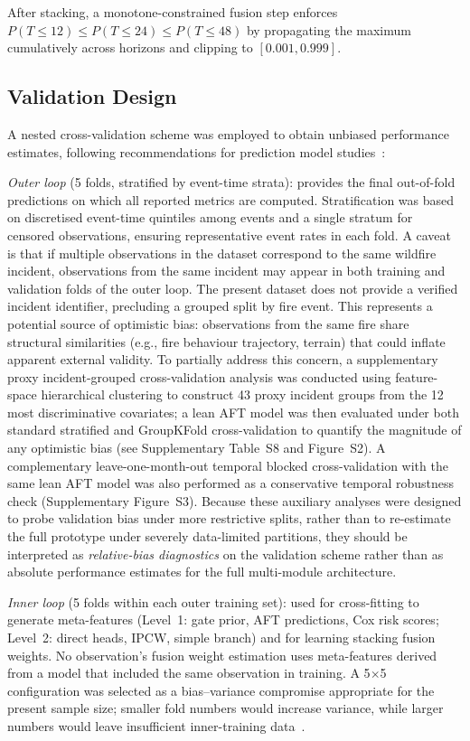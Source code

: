 \documentclass[fire,article,submit,pdftex]{../Definitions/mdpi}
\begin{document}
After stacking, a monotone-constrained fusion step enforces $P(T \leq 12) \leq P(T \leq 24) \leq P(T \leq 48)$ by propagating the maximum cumulatively across horizons and clipping to $[0.001, 0.999]$.

\subsection{Validation Design}\label{sec:validation}

A nested cross-validation scheme was employed to obtain unbiased performance estimates, following recommendations for prediction model studies~\cite{Wolff2019,Steyerberg2019}:

\emph{Outer loop} (5 folds, stratified by event-time strata): provides the final out-of-fold predictions on which all reported metrics are computed.
Stratification was based on discretised event-time quintiles among events and a single stratum for censored observations, ensuring representative event rates in each fold.
A caveat is that if multiple observations in the dataset correspond to the same wildfire incident, observations from the same incident may appear in both training and validation folds of the outer loop.
The present dataset does not provide a verified incident identifier, precluding a grouped split by fire event.
This represents a potential source of optimistic bias: observations from the same fire share structural similarities (e.g., fire behaviour trajectory, terrain) that could inflate apparent external validity.
To partially address this concern, a supplementary proxy incident-grouped cross-validation analysis was conducted using feature-space hierarchical clustering to construct 43 proxy incident groups from the 12 most discriminative covariates; a lean AFT model was then evaluated under both standard stratified and GroupKFold cross-validation to quantify the magnitude of any optimistic bias (see Supplementary Table~S8 and Figure~S2).
A complementary leave-one-month-out temporal blocked cross-validation with the same lean AFT model was also performed as a conservative temporal robustness check (Supplementary Figure~S3).
Because these auxiliary analyses were designed to probe validation bias under more restrictive splits, rather than to re-estimate the full prototype under severely data-limited partitions, they should be interpreted as \emph{relative-bias diagnostics} on the validation scheme rather than as absolute performance estimates for the full multi-module architecture.

\emph{Inner loop} (5 folds within each outer training set): used for cross-fitting to generate meta-features (Level~1: gate prior, AFT predictions, Cox risk scores; Level~2: direct heads, IPCW, simple branch) and for learning stacking fusion weights.
No observation's fusion weight estimation uses meta-features derived from a model that included the same observation in training.
A 5$\times$5 configuration was selected as a bias--variance compromise appropriate for the present sample size; smaller fold numbers would increase variance, while larger numbers would leave insufficient inner-training data~\cite{Steyerberg2019}.
\end{document}
